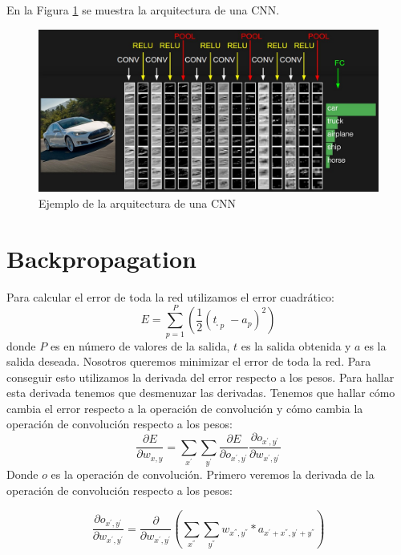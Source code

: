 \documentclass[a4paper,12pt]{article}
\begin{document}
En la Figura \ref{fig:arq} se muestra la arquitectura de una CNN.

\begin{figure}
 \centering
 \includegraphics[scale = 0.3]{2.jpeg} 
 \caption{Ejemplo de la arquitectura de una CNN \cite{Stan1}}
 \label{fig:arq}
\end{figure}

\section{Backpropagation}
Para calcular el error de toda la red utilizamos el error cuadrático:
\begin{equation}\label{eq:err}
E = \sum_{p=1}^{P}(\frac{1}{2}(ṭ_{p} - a_{p})^{2})
\end{equation}
donde $P$ es en número de valores de la salida, $t$ es la salida obtenida y $a$ es la salida deseada.
Nosotros queremos minimizar el error de toda la red. Para conseguir esto utilizamos la derivada del error respecto a los
pesos. Para hallar esta derivada tenemos que desmenuzar las derivadas. Tenemos que hallar cómo cambia el error respecto
a la operación de convolución y cómo cambia la operación de convolución respecto a los pesos:
\begin{equation}
\frac{\partial E}{\partial w_{x,y}} = \sum_{x^{'}}\sum_{y^{'}} \frac{\partial E}{\partial o_{x^{'},y^{'}}} \frac{\partial o_{x^{'},y^{'}}}{\partial w_{x^{'},y^{'}}}
\end{equation}
Donde $o$ es la operación de convolución.
Primero veremos la derivada de la operación de convolución respecto a los pesos:

\begin{equation}\label{eq:dvoc1}
\frac{\partial o_{x^{'},y^{'}}}{\partial w_{x^{'},y^{'}}} = \frac{\partial}{\partial w_{x^{'},y^{'}}} (\sum_{x^{''}}\sum_{y^{''}} w_{x^{''},y^{''}} * a_{x^{'} + x^{''},y^{'} + y^{''}})
\end{equation}
\end{document}
